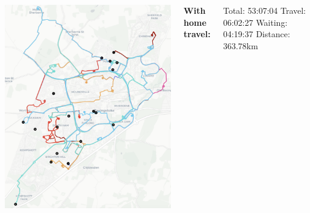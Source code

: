 \documentclass[usenames,dvipsnames]{beamer}
\begin{document}
\begin{frame}
\begin{columns}
\begin{minipage}[c][0.05\textheight][c]{\linewidth}
		\end{minipage}
		\begin{minipage}[c][0.7\textheight][c]{\linewidth}
			\centering
			\includegraphics[width=0.9\linewidth]{figures/nurseHampshire}
		\end{minipage}
		\begin{minipage}[c][0.2\textheight][c]{\linewidth}
			\scriptsize
			\hspace{17mm}\textbf{With home travel:}
			\begin{itemize}
				\setlength{\itemindent}{0.5in}
				\setlength\itemsep{-0.2em}
				\ditem Total: 53:07:04
				\ditem Travel: 06:02:27
				\ditem Waiting: 04:19:37
				\ditem Distance: 363.78km
			\end{itemize}
		\end{minipage}
	\end{columns}
\end{frame}
\end{document}
